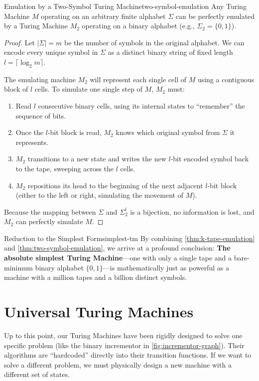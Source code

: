 \begin{theorem}{Emulation by a Two-Symbol Turing Machine}{two-symbol-emulation}
    Any Turing Machine $M$ operating on an arbitrary finite alphabet $\Sigma$ can be perfectly emulated by a Turing Machine $M_2$ operating on a binary alphabet (e.g., $\Sigma_2 = \{0, 1\}$).
    \begin{proof}
        Let $|\Sigma| = m$ be the number of symbols in the original alphabet. We can encode every unique symbol in $\Sigma$ as a distinct binary string of fixed length $l = \lceil \log_2 m \rceil$. 
        
        The emulating machine $M_2$ will represent each single cell of $M$ using a contiguous block of $l$ cells. To simulate one single step of $M$, $M_2$ must:
        \begin{enumerate}
            \item Read $l$ consecutive binary cells, using its internal states to ``remember'' the sequence of bits.
            \item Once the $l$-bit block is read, $M_2$ knows which original symbol from $\Sigma$ it represents.
            \item $M_2$ transitions to a new state and writes the new $l$-bit encoded symbol back to the tape, sweeping across the $l$ cells.
            \item $M_2$ repositions its head to the beginning of the next adjacent $l$-bit block (either to the left or right, simulating the movement of $M$).
        \end{enumerate}
        Because the mapping between $\Sigma$ and $\Sigma_2^l$ is a bijection, no information is lost, and $M_2$ can perfectly simulate $M$.
    \end{proof}
\end{theorem}

\begin{observation}{Reduction to the Simplest Form}{simplest-tm}
    By combining \cref{thm:k-tape-emulation} and \cref{thm:two-symbol-emulation}, we arrive at a profound conclusion: \textbf{The absolute simplest Turing Machine}—one with only a single tape and a bare-minimum binary alphabet $\{0,1\}$—is mathematically just as powerful as a machine with a million tapes and a billion distinct symbols.
\end{observation}

\section{Universal Turing Machines}
Up to this point, our Turing Machines have been rigidly designed to solve one specific problem (like the binary incrementor in \cref{fig:incrementor-graph}). Their algorithms are ``hardcoded'' directly into their transition functions. If we want to solve a different problem, we must physically design a new machine with a different set of states.

